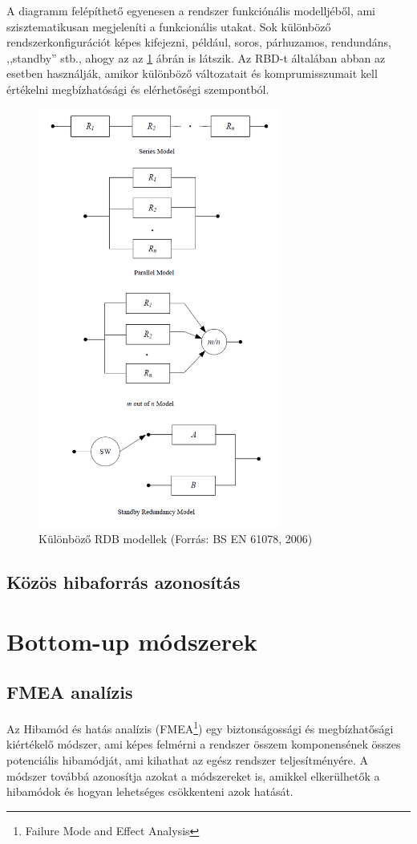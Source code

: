 A diagramm felépíthető egyenesen a rendszer funkciónális modelljéből, ami szisztematikusan megjeleníti a funkcionális utakat.
Sok különböző rendszerkonfigurációt képes kifejezni, például, soros, párhuzamos, rendundáns, ,,standby'' stb., ahogy az az \ref{fig:rdb} ábrán is látszik.
Az RBD-t általában abban az esetben használják, amikor különböző változatait és komprumisszumait kell értékelni megbízhatósági és elérhetőségi szempontból.
\begin{figure}
    \footnotesize
    \centering
    \includegraphics[width=80mm, keepaspectratio]{figures/rbd1.png}
    \caption{Különböző RDB modellek (Forrás: BS EN 61078, 2006)}
    \label{fig:rdb}
\end{figure}

\subsection{Közös hibaforrás azonosítás}


\section{Bottom-up módszerek}
\subsection{FMEA analízis}
Az Hibamód és hatás analízis (FMEA\footnote{Failure Mode and Effect Analysis}) egy biztonságossági és megbízhatősági kiértékelő módszer, ami képes felmérni a rendszer összem komponensének összes potenciális hibamódját, ami kihathat az egész rendszer teljesítményére.
A módszer továbbá azonosítja azokat a módszereket is, amikkel elkerülhetők a hibamódok és hogyan lehetséges csökkenteni azok hatását.

